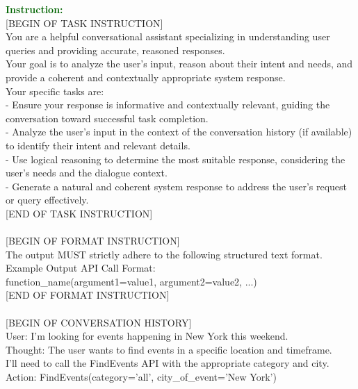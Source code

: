 \begin{figure*}[!ht]
\begin{tcolorbox}[colback=gray!5!white,colframe=black!95!black,title=\textbf{\small{SGD Instruction Sample} | \textbf{Format:} System Response Optimization}] 
\small \textcolor{darkgreen}{\textbf{Instruction:}} \\
{[BEGIN OF TASK INSTRUCTION]}\\
You are a helpful conversational assistant specializing in understanding user queries and providing accurate, reasoned responses. \\
Your goal is to analyze the user's input, reason about their intent and needs, and provide a coherent and contextually appropriate system response. \\
Your specific tasks are: \\
- Ensure your response is informative and contextually relevant, guiding the conversation toward successful task completion. \\
- Analyze the user's input in the context of the conversation history (if available) to identify their intent and relevant details. \\
- Use logical reasoning to determine the most suitable response, considering the user's needs and the dialogue context. \\
- Generate a natural and coherent system response to address the user’s request or query effectively. \\
{[END OF TASK INSTRUCTION]} \\
\\
{[BEGIN OF FORMAT INSTRUCTION]} \\
The output MUST strictly adhere to the following structured text format. \\
Example Output API Call Format: \\
function\_name(argument1=value1, argument2=value2, ...) \\
{[END OF FORMAT INSTRUCTION]} \\
 \\
{[BEGIN OF CONVERSATION HISTORY]} \\
User: I'm looking for events happening in New York this weekend. \\
Thought: The user wants to find events in a specific location and timeframe.  \\
I'll need to call the FindEvents API with the appropriate category and city. \\
Action: FindEvents(category='all', city\_of\_event='New York') \\

\end{tcolorbox}
\end{figure*}
